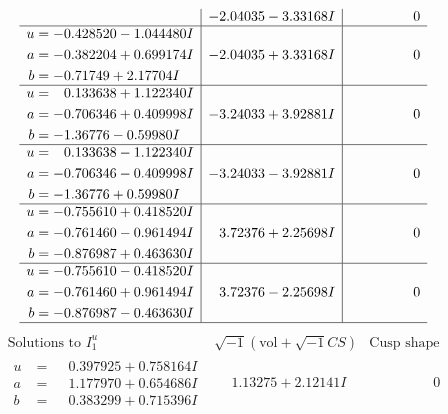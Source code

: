 \documentclass[1p]{elsarticle_modified}
\theoremstyle{definition}
\newcommand{\I}{\sqrt{-1}}
\begin{document}
$$\begin{array}{c|c|c}
 & -2.04035 - 3.33168 I & \phantom{-0.000000 } 0 \\ \hline\begin{aligned}
u &= -0.428520 - 1.044480 I \\
a &= -0.382204 + 0.699174 I \\
b &= -0.71749 + 2.17704 I\end{aligned}
 & -2.04035 + 3.33168 I & \phantom{-0.000000 } 0 \\ \hline\begin{aligned}
u &= \phantom{-}0.133638 + 1.122340 I \\
a &= -0.706346 + 0.409998 I \\
b &= -1.36776 - 0.59980 I\end{aligned}
 & -3.24033 + 3.92881 I & \phantom{-0.000000 } 0 \\ \hline\begin{aligned}
u &= \phantom{-}0.133638 - 1.122340 I \\
a &= -0.706346 - 0.409998 I \\
b &= -1.36776 + 0.59980 I\end{aligned}
 & -3.24033 - 3.92881 I & \phantom{-0.000000 } 0 \\ \hline\begin{aligned}
u &= -0.755610 + 0.418520 I \\
a &= -0.761460 - 0.961494 I \\
b &= -0.876987 + 0.463630 I\end{aligned}
 & \phantom{-}3.72376 + 2.25698 I & \phantom{-0.000000 } 0 \\ \hline\begin{aligned}
u &= -0.755610 - 0.418520 I \\
a &= -0.761460 + 0.961494 I \\
b &= -0.876987 - 0.463630 I\end{aligned}
 & \phantom{-}3.72376 - 2.25698 I & \phantom{-0.000000 } 0\\
 \hline 
 \end{array}$$\newpage$$\begin{array}{c|c|c}  
\text{Solutions to }I^u_{1}& \I (\text{vol} + \sqrt{-1}CS) & \text{Cusp shape}\\
 \hline 
\begin{aligned}
u &= \phantom{-}0.397925 + 0.758164 I \\
a &= \phantom{-}1.177970 + 0.654686 I \\
b &= \phantom{-}0.383299 + 0.715396 I\end{aligned}
 & \phantom{-}1.13275 + 2.12141 I & \phantom{-0.000000 } 0 \\ \hline\begin{aligned}

\end{aligned}
\end{array}$$
\end{document}
